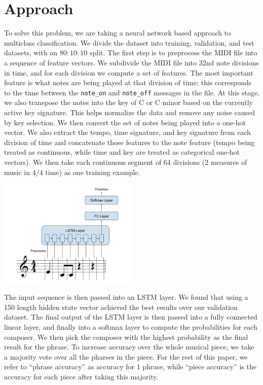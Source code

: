 \documentclass[11pt,a4paper]{article}
\begin{document}
\section{Approach}
To solve this problem, we are taking a neural network based approach to multiclass classification. We divide the dataset into training, validation, and test datasets, with an $80:10:10$ split. The first step is to preprocess the MIDI file into a sequence of feature vectors. We subdivide the MIDI file into 32nd note divisions in time, and for each division we compute a set of features. The most important feature is what notes are being played at that division of time; this corresponds to the time between the \texttt{note\_on}  and \texttt{note\_off}  messages in the file. At this stage, we also transpose the notes into the key of C or C minor based on the currently active key signature. This helps normalize the data and remove any noise caused by key selection. We then convert the set of notes being played into a one-hot vector. We also extract the tempo, time signature, and key signature from each division of time and concatenate those features to the note feature (tempo being treated as continuous, while time and key are treated as categorical one-hot vectors). We then take each continuous  segment of 64 divisions (2 measures of music in 4/4 time) as one training example.

\includegraphics[width=0.5\textwidth]{Architecture.png}

The input sequence is then passed into an LSTM layer. We found that using a 150 length hidden state vector achieved the best results over our validation dataset. The final output of the LSTM layer is then passed into a fully connected linear layer, and finally into a softmax layer to compute the probabilities for each composer. We then pick the composer with the highest probability as the final result for the phrase. To increase accuracy over the whole musical piece, we take a majority vote over all the pharses in the piece. For the rest of this paper, we refer to ``phrase accuracy'' as accuracy for 1 phrase, while ``piece accuracy'' is the accuracy for each piece after taking this majority. 
\end{document}
